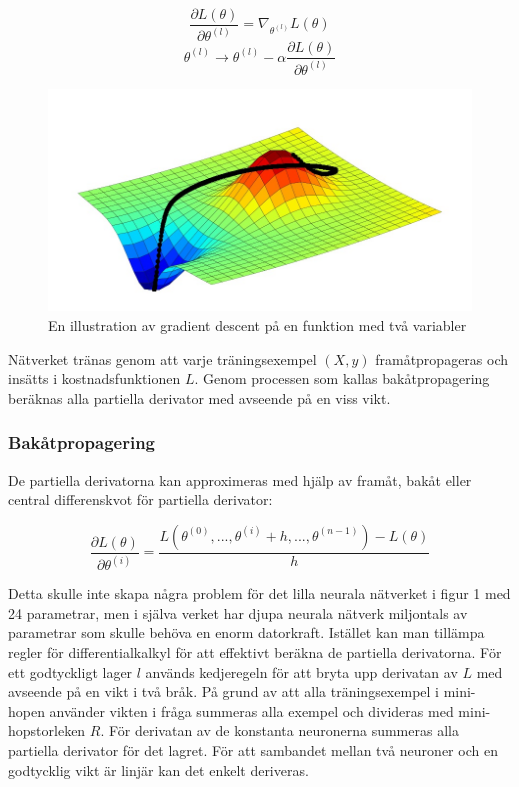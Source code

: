 \documentclass[a4paper,11pt,twoside]{article}
\newcommand*{\pd}[2]{\ensuremath{\dfrac{\partial #1}{\partial #2}}}
\begin{document}
\begin{equation}
\pd{L(\theta)}{\theta^{(l)}} = \nabla_{\theta^{(l)}} L(\theta)
\end{equation}
\begin{equation}\label{SGD}
\theta^{(l)} \to \theta^{(l)} - \alpha \pd{L(\theta)}{\theta^{(l)}}
\end{equation}
\begin{figure}[h]\label{figSGD}
	\centering
  		\includegraphics[scale=0.5]{SGD.png}
  	\caption{En illustration av gradient descent på en funktion med två variabler \cite{figSGD}}
\end{figure}
Nätverket tränas genom att varje träningsexempel $(X,y)$ framåtpropageras och insätts i kostnadsfunktionen $L$. Genom processen som kallas bakåtpropagering beräknas alla partiella derivator med avseende på en viss vikt. \cite{gradient} \cite{convmath} \cite{wikiStanford}

\subsubsection{Bakåtpropagering}

De partiella derivatorna kan approximeras med hjälp av framåt, bakåt eller central differenskvot för partiella derivator: \cite{wikiStanford} \cite{gradient}

\begin{equation}
\pd{L(\theta)}{\theta^{(i)}} = \frac{L(\theta^{(0)},...,\theta^{(i)} + h, ..., \theta^{(n-1)})-L(\theta)}{h}
\end{equation}

Detta skulle inte skapa några problem för det lilla neurala nätverket i figur 1 med 24 parametrar, men i själva verket har djupa neurala nätverk miljontals av parametrar som skulle behöva en enorm datorkraft. Istället kan man tillämpa regler för differentialkalkyl för att effektivt beräkna de partiella derivatorna. För ett godtyckligt lager $l$ används kedjeregeln för att bryta upp derivatan av $L$ med avseende på en vikt i två bråk. På grund av att alla träningsexempel i mini-hopen använder vikten i fråga summeras alla exempel och divideras med mini-hopstorleken $R$. För derivatan av de konstanta neuronerna summeras alla partiella derivator för det lagret. För att sambandet mellan två neuroner och en godtycklig vikt är linjär kan det enkelt deriveras. \cite{cs231n} \cite{convmath}
\end{document}
